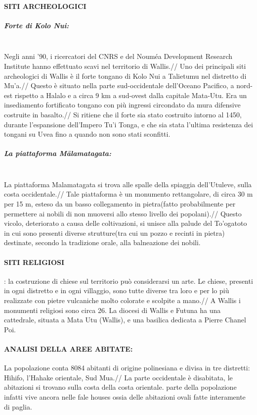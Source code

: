 \documentclass[fleqn,10pt]{SelfArx} %
\begin{document}
\paragraph{SITI ARCHEOLOGICI}
\subparagraph{Forte di Kolo Nui:} \phantom{a}\\
Negli anni '90, i ricercatori del CNRS e del Nouméa Development Research Institute hanno effettuato scavi nel territorio di Wallis.//
Uno dei principali siti archeologici di Wallis è il forte tongano di Kolo Nui a Talietumu nel distretto di Mu'a.//
Questo è situato nella parte sud-occidentale dell'Oceano Pacifico, a nord-est rispetto a Halalo e a circa 9 km a sud-ovest dalla capitale Mata-Utu.  Era un insediamento fortificato tongano con più ingressi circondato da mura difensive costruite in basalto.//
Si ritiene che il forte sia stato costruito intorno al 1450, durante l'espansione dell'Impero Tu'i Tonga, e che sia stata l'ultima resistenza dei tongani su Uvea fino a quando non sono stati
sconfitti.
\subparagraph{La piattaforma Mālamatagata:} \phantom{a} \\
La piattaforma Malamatagata si trova alle spalle della spiaggia dell'Utuleve, sulla costa occidentale.//
Tale piattaforma è un monumento rettangolare, di circa 30 m per 15 m, esteso da un basso collegamento in pietra(fatto probabilmente per permettere ai nobili di non muoversi allo stesso livello dei popolani).// 
Questo vicolo, deteriorato a causa delle coltivazioni, si unisce alla palude del To'ogatoto in cui sono presenti diverse strutture(tra cui un pozzo e recinti in pietra) destinate, secondo la tradizione orale, alla balneazione dei nobili.
 
\paragraph{SITI RELIGIOSI}:
la costruzione di chiese sul territorio può considerarsi un arte. Le chiese, presenti in ogni distretto e in ogni villaggio, sono tutte diverse tra loro e per lo più realizzate con pietre vulcaniche molto colorate e scolpite a mano.//
A Wallis i monumenti religiosi sono circa 26. La diocesi di Wallis e Futuna ha una cattedrale, situata a  Mata Utu (Wallis), e una basilica dedicata a Pierre Chanel Poi.
 
\paragraph{ANALISI DELLA AREE ABITATE:}
La popolazione conta 8084 abitanti di origine polinesiana e divisa in tre distretti: Hihifo, l'Hahake orientale, Sud Mua.// 
La parte occidentale è disabitata, le abitazioni si trovano sulla costa della costa orientale.
parte della popolazione infatti vive ancora nelle fale houses ossia delle abitazioni ovali fatte interamente di paglia.
 
\end{document}

